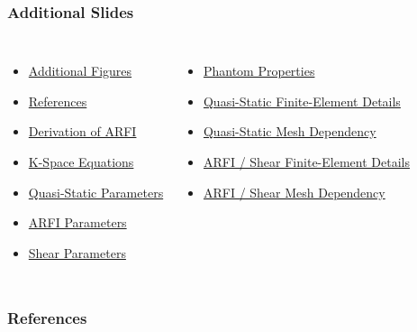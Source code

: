 \documentclass{beamer}
\begin{document}
		\begin{frame}[label=additionalSlides]
			\frametitle{Additional Slides}
			\begin{columns}[t]
					\begin{itemize}
						\item \hyperlink{additionalFigures}{Additional Figures}
						\item \hyperlink{refs}{References}
						\item \hyperlink{arfiForceDerivation}{Derivation of ARFI}
						\item \hyperlink{kSpaceEquations}{K-Space Equations}
						\item \hyperlink{qsParameters}{Quasi-Static Parameters}
						\item \hyperlink{arfiParameters}{ARFI Parameters}
						\item \hyperlink{shearParameters}{Shear Parameters}
					\end{itemize}

					\begin{itemize}
						\item \hyperlink{cirsProperties}{Phantom Properties}
						\item \hyperlink{quasiFEA}{Quasi-Static Finite-Element Details}
						\item \hyperlink{quasiMeshDepend}{Quasi-Static Mesh Dependency}
						\item \hyperlink{arfiFEA}{ARFI / Shear Finite-Element Details}
						\item \hyperlink{arfiMeshDepend}{ARFI / Shear Mesh Dependency}
					\end{itemize}
			\end{columns}
		\end{frame}

		\begin{frame}[allowframebreaks]
			\frametitle{References}
			\tiny
			\label{refs}
			
			
		\end{frame}
\end{document}
